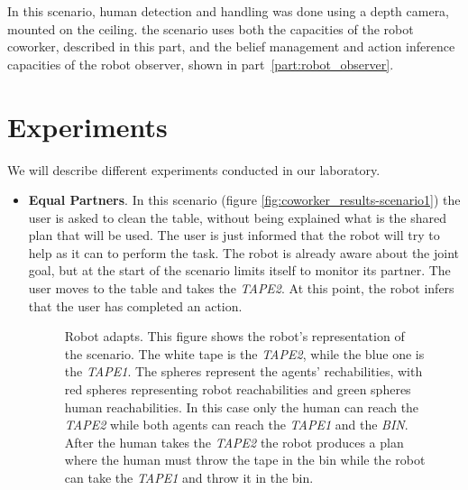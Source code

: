 In this scenario, human detection and handling was done using a depth camera, mounted on the ceiling. the scenario uses both the capacities of the robot coworker, described in this part, and the belief management and action inference capacities of the robot observer, shown in part~\ref{part:robot_observer}.

\section{Experiments}
\label{sec:coworker_experiments-experiment}
We will describe different experiments conducted in our laboratory.

\begin{itemize}
  \item
\textbf{Equal Partners}.
In this scenario (figure \ref{fig:coworker_results-scenario1}) the user is asked to clean the table, without being explained what is the shared plan that will be used. The user is just informed that
the robot will try to help as it can to perform the task. The robot is already aware about the joint goal, but at the start of the scenario limits itself to monitor its partner. The user moves to the table and takes the \textit{TAPE2}. At this point, the robot infers that the user
has completed an action.
\begin{figure}
  \caption[Robot coworker experiment 1]{Robot adapts. This figure shows the robot's representation of the scenario. The white tape is the \textit{TAPE2}, while the blue
    one is the \textit{TAPE1}. The spheres represent the agents'
    rechabilities, with red spheres representing robot reachabilities
    and green spheres human reachabilities. In this case only the human
  can reach the \textit{TAPE2} while both agents can reach the \textit{TAPE1}
and the \textit{BIN}. After the human takes the \textit{TAPE2} the
robot produces a plan where the human must throw the tape in the
bin while the robot can take the \textit{TAPE1} and throw it in the
bin.
}
\centering
  \subfigure{
}
\end{figure}
\end{itemize}
